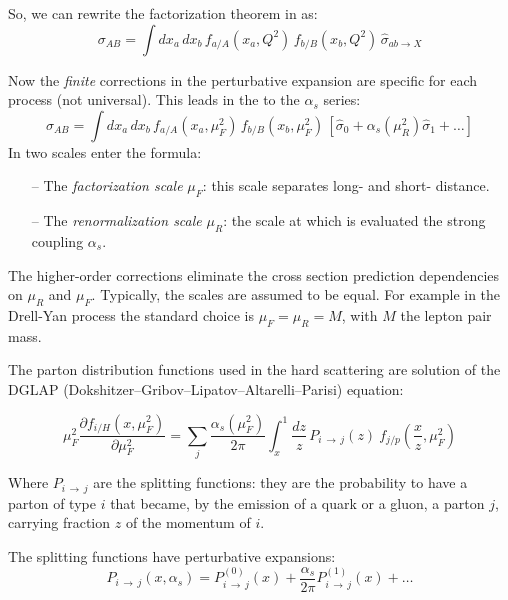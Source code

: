 So, we can rewrite the factorization theorem in  as:
\begin{equation}
	\sigma_{AB}=\displaystyle\int dx_a\,dx_b\,f_{a/A}(x_a,Q^2)\,f_{b/B}(x_b,Q^2)\,\hat{\sigma}_{ab \rightarrow X}
\label{eq:factorization2}
\end{equation}

Now the \emph{finite} corrections in the perturbative expansion are specific for each process (not universal). This leads in the  to the $\alpha_s$ series:
\begin{equation}
	\sigma_{AB}=\displaystyle\int dx_a\,dx_b\,f_{a/A}(x_a,\mu_F^2)\,f_{b/B}(x_b,\mu_F^2)\,\left[\hat{\sigma}_0+\alpha_s(\mu_R^2)\hat{\sigma}_1+\dots\right]
\label{eq:factorization3}
\end{equation}
In  two scales enter the formula:
\begin{itemize}
	\item[--] The \textit{factorization scale} $\mu_F$: this scale separates long- and short- distance.
	\item[--] The \textit{renormalization scale} $\mu_R$: the scale at which is evaluated the strong coupling $\alpha_s$.  
\end{itemize}

The higher-order corrections eliminate the cross section prediction dependencies on $\mu_R$ and $\mu_F$.
Typically, the scales are assumed to be equal.
For example in the Drell-Yan process the standard choice is $\mu_F=\mu_R=M$, with $M$ the lepton pair mass. 

The parton distribution functions used in the hard scattering are solution of the DGLAP (Dokshitzer–Gribov–Lipatov–Altarelli–Parisi) equation:

\begin{equation}
	\mu_F^2\frac{\partial f_{i/H}(x,\mu_F^2)}{\partial\mu_F^2}=\displaystyle\sum_j\frac{\alpha_s(\mu_F^2)}{2\pi}\displaystyle\int_x^1 \frac{dz}{z}\, P_{i\,\rightarrow\,j}(z)\ f_{j/p}\left(\frac{x}{z},\mu_F^2\right)
\end{equation}

Where $P_{i\,\rightarrow\,j}$ are the splitting functions: they are the probability to have a parton of type $i$ that became, by the emission of a quark or a gluon, a parton $j$, carrying fraction $z$ of the momentum of $i$.

The splitting functions have perturbative expansions: 
\begin{equation}
	P_{i\,\rightarrow\,j}(x,\alpha_s)=P_{i\,\rightarrow\,j}^{(0)}(x)+\frac{\alpha_s}{2\pi}P_{i\,\rightarrow\,j}^{(1)}(x)+\dots
\end{equation}

